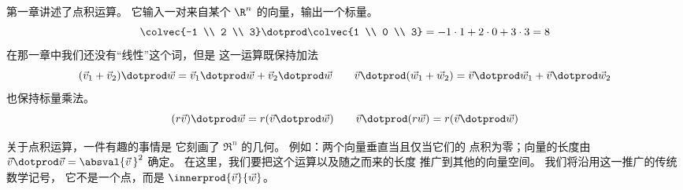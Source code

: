 \def\smashdp#1{{\setbox0=\hbox{$#1$}\dp0=0pt \box0\relax}}

第一章讲述了点积运算。
它输入一对来自某个 $\R^n$ 的向量，输出一个标量。
\begin{equation*}
  \colvec{-1 \\ 2 \\ 3}\dotprod\colvec{1 \\ 0 \\ 3}
  =-1\cdot 1+2\cdot 0+3\cdot 3
  =8
\end{equation*}
在那一章中我们还没有``线性''这个词，但是
这一运算既保持加法
\begin{equation*}
 (\vec{v}_1+\vec{v}_2)\dotprod\vec{w}=\vec{v}_1\dotprod\vec{w}
                                      +\vec{v}_2\dotprod\vec{w}
\qquad
 \vec{v}\dotprod(\vec{w}_1+\vec{w}_2)=\vec{v}\dotprod\vec{w}_1
                                      +\vec{v}\dotprod\vec{w}_2
\end{equation*}
也保持标量乘法。
\begin{equation*}
 (r\vec{v})\dotprod\vec{w}=r(\vec{v}\dotprod\vec{w})
  \qquad
 \vec{v}\dotprod(r\vec{w})=r(\vec{v}\dotprod\vec{w})
\end{equation*}

关于点积运算，一件有趣的事情是
它刻画了
$\Re^n\!$ 的几何。
例如：两个向量垂直当且仅当它们的
点积为零；向量的长度由
$\vec{v}\dotprod\vec{v}=\absval{\vec{v}\,}^2$ 确定。
在这里，我们要把这个运算以及随之而来的长度
推广到其他的向量空间。
我们将沿用这一推广的传统数学记号，
它不是一个点，而是
$\innerprod{\vec{v}}{\vec{w}}$。

